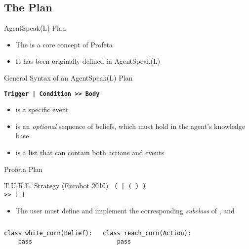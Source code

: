 \subsection{The Plan}
\begin{frame}[label=3]{AgentSpeak(L) Plan}
  \begin{itemize} 
    \item
      The  is a core concept of Profeta
    \item
      It has been originally defined in AgentSpeak(L) %
  \end{itemize}
  \begin{exampleblock}{General Syntax of an AgentSpeak(L) Plan}
    \begin{center}
      \textbf{\texttt{Trigger | Condition >> Body}}
    \end{center}
  \end{exampleblock}
\N
  \begin{itemize}
    \item
       is a specific event
    \item 
       is an \emph{optional} sequence of beliefs, 
      which must hold in the agent's knowledge base
    \item
       is a list that can contain both actions and events
  \end{itemize}
% 
\N\N
\end{frame}


\begin{frame}[label=4, fragile]{Profeta Plan}
  \begin{exampleblock}{T.U.R.E. Strategy (Eurobot 2010)}
    \texttt{ 
      (   | 
      (  )  ) \\
      \tab >> [ 
              ]
 }
  \end{exampleblock}
\N
  \begin{itemize} 
    \item 
      The user must define and implement the corresponding \emph{subclass} 
      of ,  and 
  \end{itemize}
  \begin{columns}
    \column{2.0in}
\begin{verbatim}
class white_corn(Belief):
    pass
\end{verbatim}
    \column{2.0in}
\begin{verbatim}
class reach_corn(Action):
    pass
\end{verbatim}
  \end{columns}
% 
\N\N\N
\end{frame}


